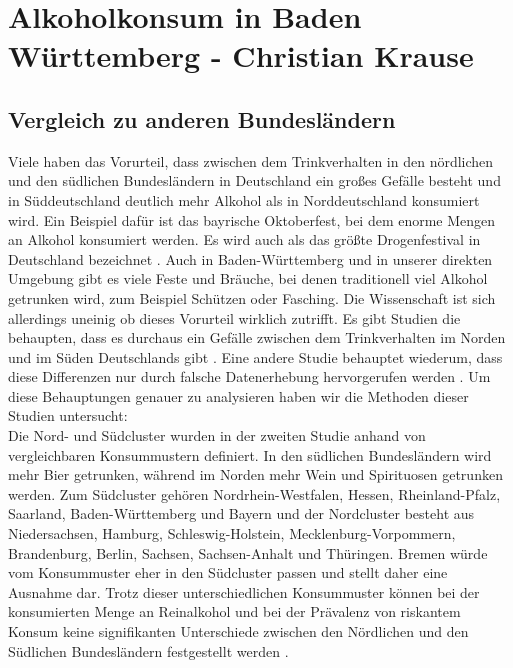 \documentclass[12pt]{article}
\begin{document}
\section{Alkoholkonsum in Baden Württemberg \footnotesize{- Christian Krause}}
\subsection{Vergleich zu anderen Bundesländern}
Viele haben das Vorurteil, dass zwischen dem Trinkverhalten in den nördlichen und den südlichen Bundesländern in Deutschland ein großes Gefälle besteht und in Süddeutschland deutlich mehr Alkohol als in Norddeutschland konsumiert wird. Ein Beispiel dafür ist das bayrische Oktoberfest, bei dem enorme Mengen an Alkohol konsumiert werden. Es wird auch als das größte Drogenfestival in Deutschland bezeichnet \autocite{effern_munchen_2023}. Auch in Baden-Württemberg und in unserer direkten Umgebung gibt es viele Feste und Bräuche, bei denen traditionell viel Alkohol getrunken wird, zum Beispiel Schützen oder Fasching. Die Wissenschaft ist sich allerdings uneinig ob dieses Vorurteil wirklich zutrifft. Es gibt Studien die behaupten, dass es durchaus ein Gefälle zwischen dem Trinkverhalten im Norden und im Süden Deutschlands gibt \autocite{meyer_regionale_1998}. Eine andere Studie behauptet wiederum, dass diese Differenzen nur durch falsche Datenerhebung hervorgerufen werden \autocite[781]{kraus_einfluss_2001}. Um diese Behauptungen genauer zu analysieren haben wir die Methoden dieser Studien untersucht: \\
Die Nord- und Südcluster wurden in der zweiten Studie anhand von vergleichbaren Konsummustern definiert. In den südlichen Bundesländern wird mehr Bier getrunken, während im Norden mehr Wein und Spirituosen getrunken werden. Zum Südcluster gehören Nordrhein-Westfalen, Hessen, Rheinland-Pfalz, Saarland, Baden-Württemberg und Bayern und der Nordcluster besteht aus Niedersachsen, Hamburg, Schleswig-Holstein, Mecklenburg-Vorpommern, Brandenburg, Berlin, Sachsen, Sachsen-Anhalt und Thüringen. Bremen würde vom Konsummuster eher in den Südcluster passen und stellt daher eine Ausnahme dar. Trotz dieser unterschiedlichen Konsummuster können bei der konsumierten Menge an Reinalkohol und bei der Prävalenz von riskantem Konsum keine signifikanten Unterschiede zwischen den Nördlichen und den Südlichen Bundesländern festgestellt werden \autocite[780]{kraus_einfluss_2001}.\\
\end{document}
